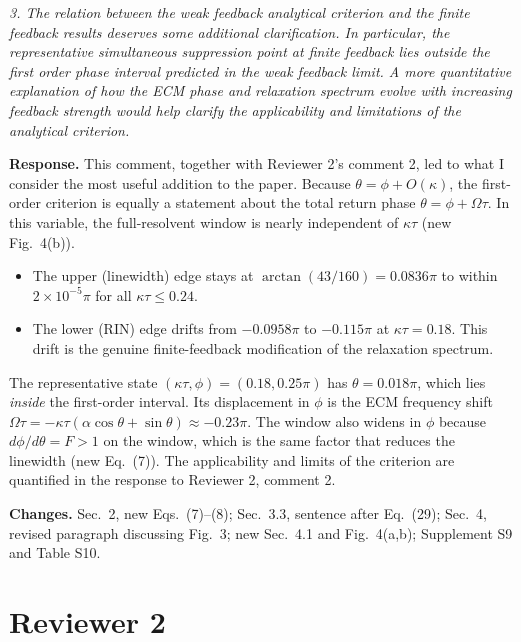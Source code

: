 \documentclass[11pt]{article}
\newenvironment{comment}{\par\medskip\noindent\begin{minipage}{\linewidth}\color{rc}\itshape}{\end{minipage}\par\smallskip}
\newcommand{\resp}{\noindent\textbf{Response.} }
\newcommand{\chg}{\par\noindent\textbf{Changes.} }
\begin{document}
\begin{comment}3. The relation between the weak feedback analytical criterion and the finite feedback results deserves some additional clarification. In particular, the representative simultaneous suppression point at finite feedback lies outside the first order phase interval predicted in the weak feedback limit. A more quantitative explanation of how the ECM phase and relaxation spectrum evolve with increasing feedback strength would help clarify the applicability and limitations of the analytical criterion.\end{comment}
\resp This comment, together with Reviewer 2's comment 2, led to what I consider the most useful addition to the paper. Because $\theta=\phi+O(\kappa)$, the first-order criterion is equally a statement about the total return phase $\theta=\phi+\Omega\tau$. In this variable, the full-resolvent window is nearly independent of $\kappa\tau$ (new Fig.~4(b)).
\begin{itemize}
\item The upper (linewidth) edge stays at $\arctan(43/160)=0.0836\pi$ to within $2\times10^{-5}\pi$ for all $\kappa\tau\le0.24$.
\item The lower (RIN) edge drifts from $-0.0958\pi$ to $-0.115\pi$ at $\kappa\tau=0.18$. This drift is the genuine finite-feedback modification of the relaxation spectrum.
\end{itemize}
The representative state $(\kappa\tau,\phi)=(0.18,0.25\pi)$ has $\theta=0.018\pi$, which lies \emph{inside} the first-order interval. Its displacement in $\phi$ is the ECM frequency shift $\Omega\tau=-\kappa\tau(\alpha\cos\theta+\sin\theta)\approx-0.23\pi$. The window also widens in $\phi$ because $d\phi/d\theta=F>1$ on the window, which is the same factor that reduces the linewidth (new Eq.~(7)). The applicability and limits of the criterion are quantified in the response to Reviewer 2, comment 2.
\chg Sec.~2, new Eqs.~(7)--(8); Sec.~3.3, sentence after Eq.~(29); Sec.~4, revised paragraph discussing Fig.~3; new Sec.~4.1 and Fig.~4(a,b); Supplement S9 and Table S10.

\section*{Reviewer 2}
\end{document}
